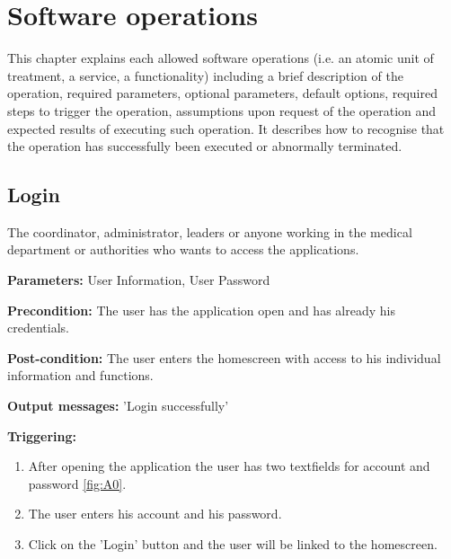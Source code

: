 \chapter{Software operations}
\label{chap:soptware_operations}


This chapter explains each allowed software operations (i.e. an atomic
unit of treatment, a service, a functionality) including a brief description of 
the operation, required parameters, optional parameters, default options, 
required steps to trigger the operation, assumptions upon request of the
operation  and expected results of executing such operation.
It describes how to recognise that the operation has successfully been executed
or abnormally terminated. 

\section{Login}
\label{operation:Login}
The coordinator, administrator, leaders or anyone working in the medical
department or authorities who wants to access the applications.\\
\begin{description}
\item \textbf{Parameters:} User Information, User Password
\item \textbf{Precondition:} The user has the application open and has already
his credentials.
\item \textbf{Post-condition:}  The user enters the homescreen with access to
his individual information and functions.
\item \textbf{Output messages:} 'Login successfully'
\item \textbf{Triggering:}
\begin{enumerate}
\item After opening the application the user has two textfields for account and
password \ref{fig:A0}.
\item The user enters his account and his password.
\item Click on the 'Login' button and the user will be linked to the homescreen.
\end{enumerate}
\end{description}

